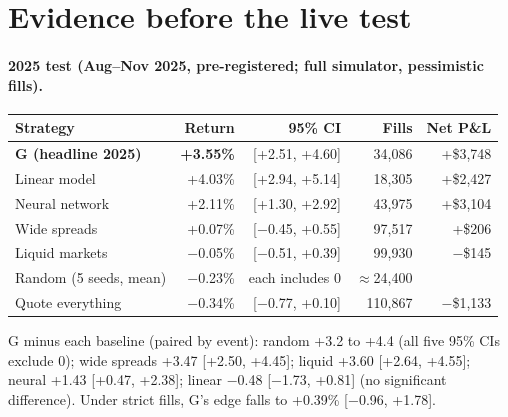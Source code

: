 \documentclass[11pt,a4paper]{article}
\newcommand{\pos}[1]{\textcolor{green!45!black}{#1}}
\newcommand{\negv}[1]{\textcolor{red!65!black}{#1}}
\begin{document}
\section{Evidence before the live test}\label{sec:evidence}
\paragraph{2025 test (Aug--Nov 2025, pre-registered; full simulator, pessimistic fills).}
\begin{center}
\small
\begin{tabular}{@{}lrrrr@{}}
\toprule
Strategy & Return & 95\% CI & Fills & Net P\&L \\
\midrule
\textbf{G (headline 2025)} & \pos{\textbf{+3.55\%}} & [+2.51, +4.60] & 34,086 & \pos{+\$3,748} \\
Linear model & \pos{+4.03\%} & [+2.94, +5.14] & 18,305 & \pos{+\$2,427} \\
Neural network & \pos{+2.11\%} & [+1.30, +2.92] & 43,975 & \pos{+\$3,104} \\
Wide spreads & +0.07\% & [$-$0.45, +0.55] & 97,517 & +\$206 \\
Liquid markets & $-$0.05\% & [$-$0.51, +0.39] & 99,930 & \negv{$-$\$145} \\
Random (5 seeds, mean) & \negv{$-$0.23\%} & each includes 0 & $\approx$24,400 & \\
Quote everything & \negv{$-$0.34\%} & [$-$0.77, +0.10] & 110,867 & \negv{$-$\$1,133} \\
\bottomrule
\end{tabular}
\end{center}
G minus each baseline (paired by event): random +3.2 to +4.4 (all five 95\% CIs exclude 0); wide spreads +3.47
[+2.50, +4.45]; liquid +3.60 [+2.64, +4.55]; neural +1.43 [+0.47, +2.38]; linear $-$0.48 [$-$1.73, +0.81]
(no significant difference). Under strict fills, G's edge falls to +0.39\% [$-$0.96, +1.78].
\end{document}
